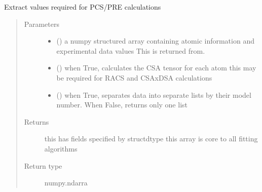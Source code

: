 \documentclass[a4paper,10pt,english,openany,oneside]{sphinxmanual}
\begin{document}
\begin{fulllineitems}
\label{\detokenize{reference/generated/paramagpy.fit.extract_atom_data:paramagpy.fit.extract_atom_data}}
Extract values required for PCS/PRE calculations
\begin{quote}\begin{description}
\item[{Parameters}] \leavevmode\begin{itemize}
\item {} 
 () \textendash{} a numpy structured array containing atomic information
and experimental data values
This is returned from.
{\hyperref[\detokenize{reference/generated/paramagpy.protein.CustomStructure.parse:paramagpy.protein.CustomStructure.parse}]{}}

\item {} 
 (\sphinxstyleliteralemphasis{\sphinxupquote{, }}) \textendash{} when True, calculates the CSA tensor for each atom
this may be required for RACS and CSAxDSA calculations

\item {} 
 (\sphinxstyleliteralemphasis{\sphinxupquote{, }}) \textendash{} when True, separates data into separate lists
by their model number. When False, returns only one list

\end{itemize}

\item[{Returns}] \leavevmode
{} \textendash{} this has fields specified by structdtype
this array is core to all fitting algorithms

\item[{Return type}] \leavevmode
numpy.ndarra

\end{description}\end{quote}

\end{fulllineitems}
\end{document}
